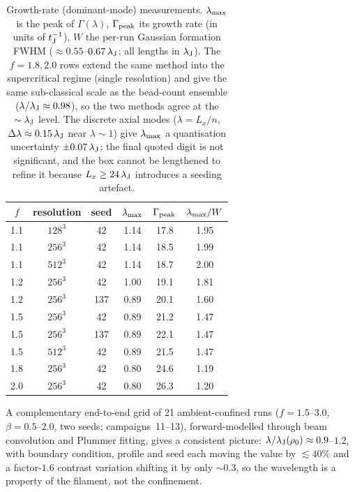 \documentclass[usenatbib,twoside,twocolumn]{mnras}
\begin{document}
\begin{table}
\caption{Growth-rate (dominant-mode) measurements. $\lambda_{\rm max}$ is the peak of $\Gamma(\lambda)$, $\Gamma_{\rm peak}$ its growth rate (in units of $t_{\rm J}^{-1}$), $W$ the per-run Gaussian formation FWHM ($\approx0.55$--$0.67\,\lambda_{\rm J}$; all lengths in $\lambda_{\rm J}$). The $f=1.8,2.0$ rows extend the same method into the supercritical regime (single resolution) and give the same sub-classical scale as the bead-count ensemble ($\lambda/\lambda_{\rm J}\approx0.98$), so the two methods agree at the $\sim\lambda_{\rm J}$ level. The discrete axial modes ($\lambda=L_x/n$, $\Delta\lambda\approx0.15\,\lambda_{\rm J}$ near $\lambda\sim1$) give $\lambda_{\rm max}$ a quantisation uncertainty $\pm0.07\,\lambda_{\rm J}$; the final quoted digit is not significant, and the box cannot be lengthened to refine it because $L_x\geq24\,\lambda_{\rm J}$ introduces a seeding artefact.}
\label{tab:wave}
\footnotesize
\setlength{\tabcolsep}{4pt}
\begin{tabular}{cccccc}
\toprule
$f$ & resolution & seed & $\lambda_{\rm max}$ & $\Gamma_{\rm peak}$ & $\lambda_{\rm max}/W$ \\
\midrule
1.1 & $128^3$ & 42  & 1.14 & 17.8 & 1.95 \\
1.1 & $256^3$ & 42  & 1.14 & 18.5 & 1.99 \\
1.1 & $512^3$ & 42  & 1.14 & 18.7 & 2.00 \\
1.2 & $256^3$ & 42  & 1.00 & 19.1 & 1.81 \\
1.2 & $256^3$ & 137 & 0.89 & 20.1 & 1.60 \\
1.5 & $256^3$ & 42  & 0.89 & 21.2 & 1.47 \\
1.5 & $256^3$ & 137 & 0.89 & 22.1 & 1.47 \\
1.5 & $512^3$ & 42  & 0.89 & 21.5 & 1.47 \\
1.8 & $256^3$ & 42  & 0.80 & 24.6 & 1.19 \\
2.0 & $256^3$ & 42  & 0.80 & 26.3 & 1.20 \\
\bottomrule
\end{tabular}
\end{table}

A complementary end-to-end grid of 21 ambient-confined runs ($f=1.5$--$3.0$, $\beta=0.5$--$2.0$, two seeds; campaigns~11--13), forward-modelled through beam convolution and Plummer fitting, gives a consistent picture: $\lambda/\lambda_{\rm J}(\rho_0)\approx0.9$--$1.2$, with boundary condition, profile and seed each moving the value by $\lesssim40\%$ and a factor-$1.6$ contrast variation shifting it by only $\sim0.3$, so the wavelength is a property of the filament, not the confinement.
\end{document}
